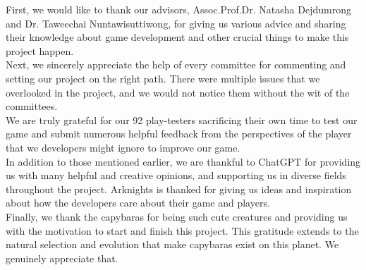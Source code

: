 \documentclass[12pt,oneside,openright,a4paper]{cpe-english-project}
\begin{document}
First, we would like to thank our advisors, Assoc.Prof.Dr. Natasha Dejdumrong and Dr. Taweechai Nuntawisuttiwong, for giving us various advice and sharing their knowledge about game development and other crucial things to make this project happen. \\
Next, we sincerely appreciate the help of every committee for commenting and setting our project on the right path. There were multiple issues that we overlooked in the project, and we would not notice them without the wit of the committees. \\
We are truly grateful for our 92 play-testers sacrificing their own time to test our game and submit numerous helpful feedback from the perspectives of the player that we developers might ignore to improve our game. \\
In addition to those mentioned earlier, we are thankful to ChatGPT for providing us with many helpful and creative opinions, and supporting us in diverse fields throughout the project. Arknights is thanked for giving us ideas and inspiration about how the developers care about their game and players. \\
Finally, we thank the capybaras for being such cute creatures and providing us with the motivation to start and finish this project. This gratitude extends to the natural selection and evolution that make capybaras exist on this planet. We genuinely appreciate that.


\tableofcontents                    
\listoftables
\listoffigures                      
\end{document}
